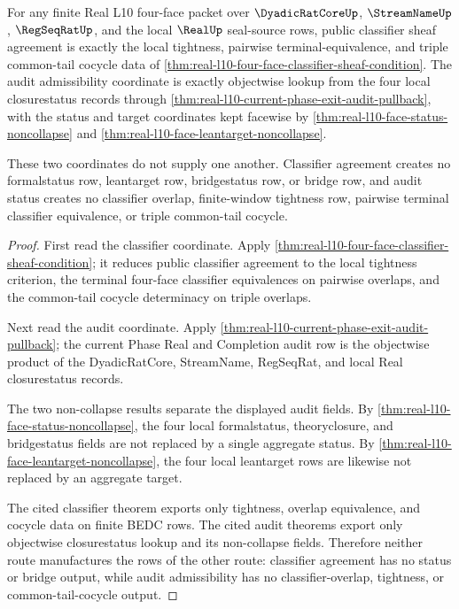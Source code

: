 \begin{theorem}
\label{thm:real-l10-classifier-status-axis-separation}
For any finite Real L10 four-face packet over $\DyadicRatCoreUp$, $\StreamNameUp$, $\RegSeqRatUp$, and the local $\RealUp$ seal-source rows, public classifier sheaf agreement is exactly the local tightness, pairwise terminal-equivalence, and triple common-tail cocycle data of \autoref{thm:real-l10-four-face-classifier-sheaf-condition}. The audit admissibility coordinate is exactly objectwise lookup from the four local closurestatus records through \autoref{thm:real-l10-current-phase-exit-audit-pullback}, with the status and target coordinates kept facewise by \autoref{thm:real-l10-face-status-noncollapse} and \autoref{thm:real-l10-face-leantarget-noncollapse}.

These two coordinates do not supply one another. Classifier agreement creates no formalstatus row, leantarget row, bridgestatus row, or bridge row, and audit status creates no classifier overlap, finite-window tightness row, pairwise terminal classifier equivalence, or triple common-tail cocycle.
\end{theorem}
\begin{proof}
First read the classifier coordinate. Apply \autoref{thm:real-l10-four-face-classifier-sheaf-condition}; it reduces public classifier agreement to the local tightness criterion, the terminal four-face classifier equivalences on pairwise overlaps, and the common-tail cocycle determinacy on triple overlaps.

Next read the audit coordinate. Apply \autoref{thm:real-l10-current-phase-exit-audit-pullback}; the current Phase Real and Completion audit row is the objectwise product of the DyadicRatCore, StreamName, RegSeqRat, and local Real closurestatus records.

The two non-collapse results separate the displayed audit fields. By \autoref{thm:real-l10-face-status-noncollapse}, the four local formalstatus, theoryclosure, and bridgestatus fields are not replaced by a single aggregate status. By \autoref{thm:real-l10-face-leantarget-noncollapse}, the four local leantarget rows are likewise not replaced by an aggregate target.

The cited classifier theorem exports only tightness, overlap equivalence, and cocycle data on finite BEDC rows. The cited audit theorems export only objectwise closurestatus lookup and its non-collapse fields. Therefore neither route manufactures the rows of the other route: classifier agreement has no status or bridge output, while audit admissibility has no classifier-overlap, tightness, or common-tail-cocycle output.
\end{proof}

